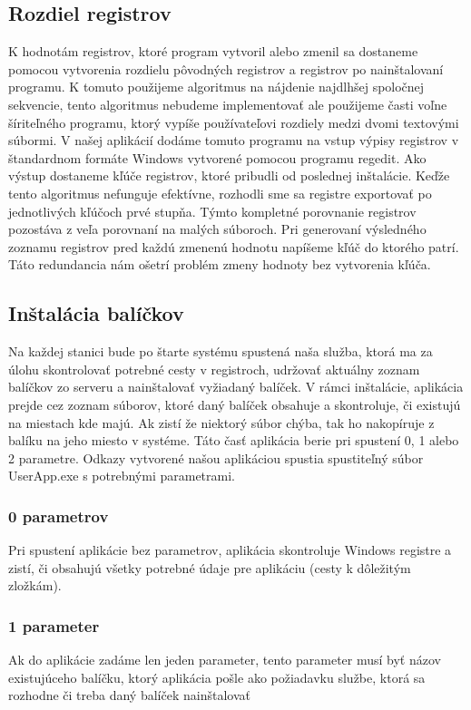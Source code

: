 \subsection{Rozdiel registrov}
K hodnotám registrov, ktoré program vytvoril alebo zmenil sa dostaneme pomocou vytvorenia rozdielu pôvodných registrov a registrov po nainštalovaní programu. K tomuto použijeme algoritmus na nájdenie najdlhšej spoločnej sekvencie, tento algoritmus nebudeme implementovať ale použijeme časti voľne šíriteľného programu, ktorý vypíše používateľovi rozdiely medzi dvomi textovými súbormi. V našej aplikácií dodáme tomuto programu na vstup výpisy registrov v štandardnom formáte Windows vytvorené pomocou programu regedit. Ako výstup dostaneme kľúče registrov, ktoré pribudli od poslednej inštalácie. Keďže tento algoritmus nefunguje efektívne, rozhodli sme sa registre exportovať po jednotlivých kľúčoch prvé stupňa. Týmto kompletné porovnanie registrov pozostáva z veľa porovnaní na malých súboroch. Pri generovaní výsledného zoznamu registrov pred každú zmenenú hodnotu napíšeme kľúč do ktorého patrí. Táto redundancia nám ošetrí problém zmeny hodnoty bez vytvorenia kľúča.

\subsection{Inštalácia balíčkov}
Na každej stanici bude po štarte systému spustená naša služba, ktorá ma za úlohu skontrolovať potrebné cesty v registroch, udržovať aktuálny zoznam balíčkov zo serveru a nainštalovať vyžiadaný balíček. V rámci inštalácie, aplikácia prejde cez zoznam súborov, ktoré daný balíček obsahuje a skontroluje, či existujú na miestach kde majú. Ak zistí že niektorý súbor chýba, tak ho nakopíruje z balíku na jeho miesto v systéme. Táto časť aplikácia berie pri spustení 0, 1 alebo 2 parametre. Odkazy vytvorené našou aplikáciou spustia spustiteľný súbor UserApp.exe s potrebnými parametrami.

\subsubsection{0 parametrov}
Pri spustení aplikácie bez parametrov, aplikácia skontroluje Windows registre a zistí, či obsahujú všetky potrebné údaje pre aplikáciu (cesty k dôležitým zložkám).

\subsubsection{1 parameter}
Ak do aplikácie zadáme len jeden parameter, tento parameter musí byť názov existujúceho balíčku, ktorý aplikácia pošle ako požiadavku službe, ktorá sa rozhodne či treba daný balíček nainštalovať

